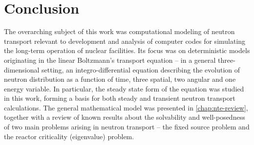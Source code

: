 \documentclass[twoside, 12pt]{thesis}
\begin{document}
\listoffigures
\listoftables 




% 


    






\mainmatter

\renewcommand{\chaptername}{} %



  
  
  
  
  
  

\chapter{Conclusion}

The overarching subject of this work was computational modeling of neutron transport relevant to development and
analysis of computer codes for simulating the long-term operation of nuclear facilities. Its focus was on deterministic
models originating in the linear Boltzmann's transport equation -- in a general three-dimensional setting, an
integro-differential equation describing the evolution of neutron distribution as a function of time, three spatial, two
angular and one energy variable. In particular, the steady state form of the equation was studied in this work, forming
a basis for both steady and transient neutron transport calculations. The general mathematical model was presented in
\cref{chap:nte-review}, together with a review of known results about the solvability and well-posedness of two main
problems arising in neutron transport -- the fixed source problem and the reactor criticality (eigenvalue) problem.
\end{document}
